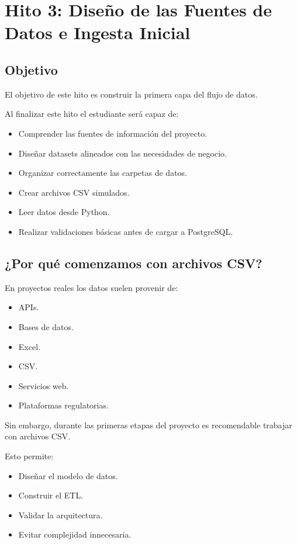 \chapter{Hito 3: Diseño de las Fuentes de Datos e Ingesta Inicial}

\section{Objetivo}

El objetivo de este hito es construir la primera capa del flujo de datos.

Al finalizar este hito el estudiante será capaz de:

\begin{itemize}
\item Comprender las fuentes de información del proyecto.
\item Diseñar datasets alineados con las necesidades de negocio.
\item Organizar correctamente las carpetas de datos.
\item Crear archivos CSV simulados.
\item Leer datos desde Python.
\item Realizar validaciones básicas antes de cargar a PostgreSQL.
\end{itemize}

\section{¿Por qué comenzamos con archivos CSV?}

En proyectos reales los datos suelen provenir de:

\begin{itemize}
\item APIs.
\item Bases de datos.
\item Excel.
\item CSV.
\item Servicios web.
\item Plataformas regulatorias.
\end{itemize}

Sin embargo, durante las primeras etapas del proyecto es recomendable trabajar con archivos CSV.

Esto permite:

\begin{itemize}
\item Diseñar el modelo de datos.
\item Construir el ETL.
\item Validar la arquitectura.
\item Evitar complejidad innecesaria.
\end{itemize}

